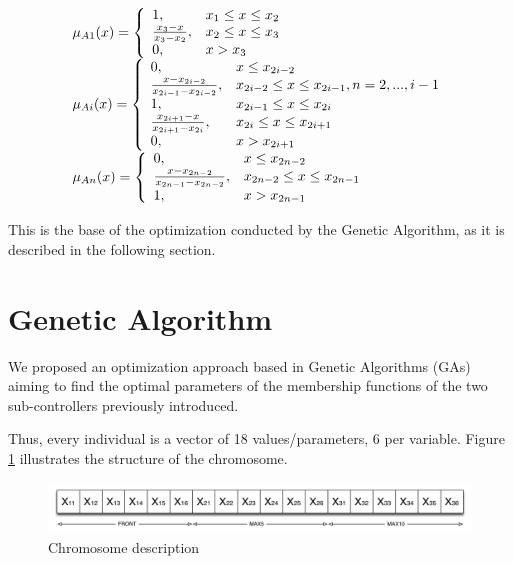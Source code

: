 \documentclass[conference]{IEEEtran}
\begin{document}
\begin{equation} 
\begin{tabular}{l}
$\mu_{A1}(x)=  \left \{
\begin{array}{ll}
1, &x_{1} \leq x \leq x_{2}\\
\frac{x_{3} - x}{x_{3} - x_{2}}, &x_{2} \leq x \leq x_{3}\\
0        , &x > x_{3}\\
\end{array} 
\right.$		\\ 	
$\mu_{Ai}(x)= \left \{
\begin{array}{ll} 
0, &x \leq x_{2i-2}\\
\frac{x - x_{2i-2}}{x_{2i-1} - x_{2i-2}}, &x_{2i-2} \leq x \leq x_{2i-1},n=2,...,i-1\\
1, & x_{2i-1} \leq x \leq x_{2i}\\
\frac{x_{2i+1} - x}{x_{2i+1} - x_{2i}},& x_{2i} \leq x \leq x_{2i+1}\\
0  , &x > x_{2i+1}\\
\end{array}  
\right.	$		\\
$\mu_{An}(x)= \left \{
\begin{array}{ll} 
0, &x \leq x_{2n-2}\\
\frac{x - x_{2n-2}}{x_{2n-1} - x_{2n-2}},& x_{2n-2} \leq x \leq x_{2n-1}\\
1 ,& x > x_{2n-1} 
\end{array} 
\right.$\\
\label{eq:e1}
\end{tabular}
\end{equation}

This is the base of the optimization conducted by the Genetic Algorithm, as it is described in the following section.



\section{Genetic Algorithm}
\label{sec:GA_optimization}

We proposed an optimization approach based in Genetic Algorithms (GAs) \cite{GAs_Goldberg89} aiming to find the optimal parameters of the membership functions of the two sub-controllers previously introduced. 

Thus, every individual is a vector of 18 values/parameters, 6 per variable. Figure \ref {fig:cromosome} illustrates the structure of the chromosome.
\begin{figure}[!ht]	
  \begin{center}
    \includegraphics[width=12cm]{fig/chromosome2.png}
    \caption{Chromosome description}
    \label{fig:cromosome}	
  \end{center}	
\end{figure}
\end{document}
